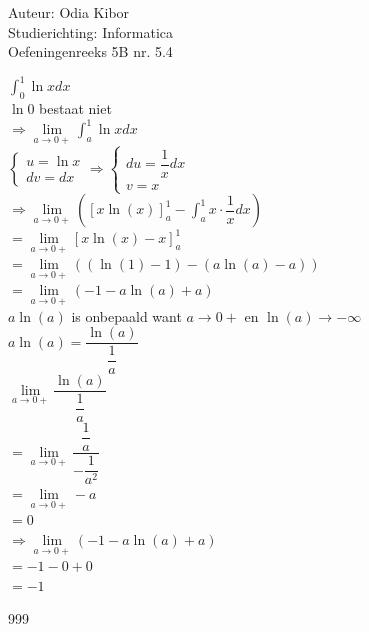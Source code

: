 \documentclass[a4paper]{article}
\begin{document}
  
\noindent \large Auteur: Odia Kibor \\
\noindent \large Studierichting: Informatica\\
\noindent \large Oefeningenreeks 5B nr. 5.4
\\

\medskip

\normalsize


$\displaystyle\int_{0}^{1} \ln x dx $\\

$\ln 0$ bestaat niet\\

$\Rightarrow  \lim\limits_{a \rightarrow 0+} \displaystyle\int_{a}^{1} \ln x dx $\\

$\left\{
\begin{array}{l}
	u = \ln x \\ 
	dv = dx
\end{array}\right.
\Rightarrow 
\left\{
\begin{array}{l}
	du = \dfrac{1}{x} dx\\
 	v = x 
\end{array}
\right.$\\

$\Rightarrow  \lim\limits_{a \rightarrow 0+} \left (\left[x \ln (x)\right]_{a}^{1} - \displaystyle\int_{a}^{1} x \cdot \dfrac{1}{x} dx\right )$\\

$= \lim\limits_{a \rightarrow 0+} \left[x \ln (x) - x \right]_{a}^{1} $\\

$= \lim\limits_{a \rightarrow 0+} ((\ln (1) - 1) - (a\ln (a) - a))$\\

$= \lim\limits_{a \rightarrow 0+} (- 1 - a\ln (a) + a)$\\

$a\ln(a)$ is onbepaald want $a \rightarrow 0+$ en $\ln(a) \rightarrow -\infty$\\

$a\ln(a) = \dfrac{\ln(a)}{\dfrac{1}{a}}$\\

$\lim\limits_{a \rightarrow 0+} \dfrac{\ln(a)}{\dfrac{1}{a}}$\\

$= \lim\limits_{a \rightarrow 0+} \dfrac{\dfrac{1}{a}}{-\dfrac{1}{a^2}}$\\

$= \lim\limits_{a \rightarrow 0+} -a$\\

$= 0$\\

$\Rightarrow \lim\limits_{a \rightarrow 0+} (- 1 - a\ln (a) + a)$\\

$= -1 - 0 + 0$\\

$= -1$\\



















\begin{thebibliography}{999}
\end{thebibliography}
\end{document}
